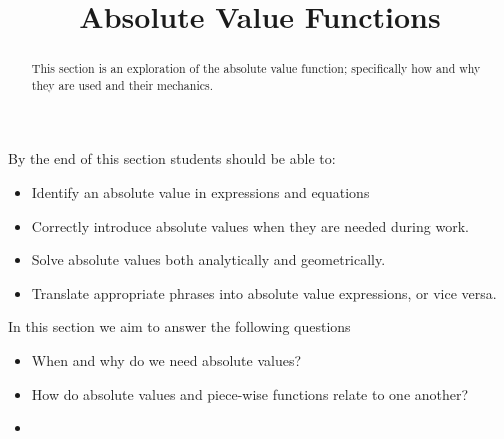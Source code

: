 \documentclass{ximeraXloud}
\title{Absolute Value Functions}
\begin{document}
\begin{abstract}
    This section is an exploration of the absolute value function; specifically how and why they are used and their mechanics.
\end{abstract}
\maketitle
By the end of this section students should be able to:

\begin{itemize}
    \item Identify an absolute value in expressions and equations
    \item Correctly introduce absolute values when they are needed during work.
    \item Solve absolute values both analytically and geometrically.
    \item Translate appropriate phrases into absolute value expressions, or vice versa.
\end{itemize}


In this section we aim to answer the following questions

\begin{itemize}
    \item When and why do we need absolute values?
    \item How do absolute values and piece-wise functions relate to one another?
    \item 
\end{itemize}
\end{document}

